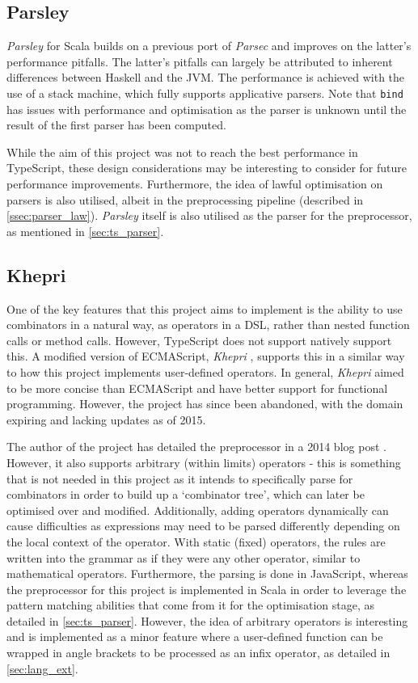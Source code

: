 \subsection{Parsley}
\label{ssec:parsley}

\textit{Parsley} for Scala \cite{willis18} builds on a previous port of \textit{Parsec} and improves on the latter's performance pitfalls.
The latter's pitfalls can largely be attributed to inherent differences between Haskell and the JVM.
The performance is achieved with the use of a stack machine, which fully supports applicative parsers.
Note that \texttt{bind} has issues with performance and optimisation as the parser is unknown until the result of the first parser has been computed.

While the aim of this project was not to reach the best performance in TypeScript, these design considerations may be interesting to consider for future performance improvements.
Furthermore, the idea of lawful optimisation on parsers is also utilised, albeit in the preprocessing pipeline (described in \autoref{ssec:parser_law}).
\textit{Parsley} itself is also utilised as the parser for the preprocessor, as mentioned in \autoref{sec:ts_parser}.

\subsection{Khepri}
\label{ssec:khepri}

One of the key features that this project aims to implement is the ability to use combinators in a natural way, as operators in a DSL, rather than nested function calls or method calls.
However, TypeScript does not support natively support this.
A modified version of ECMAScript, \textit{Khepri} \cite{khepriwiki}, supports this in a similar way to how this project implements user-defined operators.
In general, \textit{Khepri} aimed to be more concise than ECMAScript and have better support for functional programming.
However, the project has since been abandoned, with the domain expiring and lacking updates as of 2015.

The author of the project has detailed the preprocessor in a 2014 blog post \cite{khepriudo}.
However, it also supports arbitrary (within limits) operators - this is something that is not needed in this project as it intends to specifically parse for combinators in order to build up a `combinator tree', which can later be optimised over and modified.
Additionally, adding operators dynamically can cause difficulties as expressions may need to be parsed differently depending on the local context of the operator.
With static (fixed) operators, the rules are written into the grammar as if they were any other operator, similar to mathematical operators.
Furthermore, the parsing is done in JavaScript, whereas the preprocessor for this project is implemented in Scala in order to leverage the pattern matching abilities that come from it for the optimisation stage, as detailed in \autoref{sec:ts_parser}.
However, the idea of arbitrary operators is interesting and is implemented as a minor feature where a user-defined function can be wrapped in angle brackets to be processed as an infix operator, as detailed in \autoref{sec:lang_ext}.
